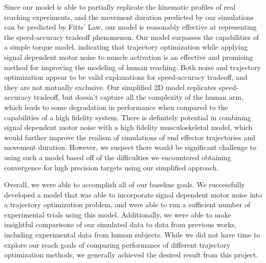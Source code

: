 \documentclass[letterpaper, 10pt, conference]{ieeeconf}
\begin{document}
\par Since our model is able to partially replicate the kinematic profiles of real reaching experiments, and the movement duration predicted by our simulations can be predicted by Fitts' Law, our model is reasonably effective at representing the speed-accuracy tradeoff phenomenon. Our model surpasses the capabilities of a simple torque model, indicating that trajectory optimization while applying signal dependent motor noise to muscle activation is an effective and promising method for improving the modeling of human reaching. Both noise and trajectory optimization appear to be valid explanations for speed-accuracy tradeoff, and they are not mutually exclusive. Our simplified 2D model replicates speed-accuracy tradeoff, but doesn't capture all the complexity of the human arm, which leads to some degradation in performance when compared to the capabilities of a high fidelity system. There is definitely potential in combining signal dependent motor noise with a high fidelity musculoskeletal model, which would further improve the realism of simulations of end effector trajectories and movement duration. However, we suspect there would be significant challenge to using such a model based off of the difficulties we encountered obtaining convergence for high precision targets using our simplified approach. 

Overall, we were able to accomplish all of our baseline goals. We successfully developed a model that was able to incorporate signal dependent motor noise into a trajectory optimization problem, and were able to run a sufficient number of experimental trials using this model. Additionally, we were able to make insightful comparisons of our simulated data to data from previous works, including experimental data from human subjects. While we did not have time to explore our reach goals of comparing performance of different trajectory optimization methods, we generally achieved the desired result from this project.
\end{document}

